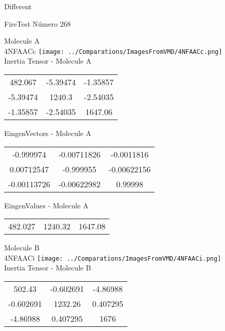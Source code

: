 \begin{center}
\vtab
\vtab
\textcolor{NavyBlue}{\Large Different}
\end{center}

 \newpage

\vtab[-2cm]
\begin{center}
{\large FireTest \tab Número 268}
\end{center}
\begin{multicols}{2}
\begin{center}

Molecule A \\ 
4NFAACc
\texttt{[image: ../Comparations/ImagesFromVMD/4NFAACc.png]}
\\
Inertia Tensor - Molecule A \\
\vtab

\begin{tabular}{|c c c|}
482.067	 & 	-5.39474	 & 	-1.35857	 \\
-5.39474	 & 	1240.3	 & 	-2.54035	 \\
-1.35857	 & 	-2.54035	 & 	1647.06
\end{tabular}

\vtab
 EingenVectors - Molecule A     \\
\vtab
\begin{tabular}{|c c c|}
-0.999974	 & 	-0.00711826	 & 	-0.0011816	 \\
0.00712547	 & 	-0.999955	 & 	-0.00622156	 \\
-0.00113726	 & 	-0.00622982	 & 	0.99998
\end{tabular}

\vtab
 EingenValues - Molecule A     \\
\vtab
\begin{tabular}{|c c c|}
482.027	 & 	1240.32	 & 	1647.08	 \\
\end{tabular}
\columnbreak

Molecule B \\ 
4NFAACi
\texttt{[image: ../Comparations/ImagesFromVMD/4NFAACi.png]}
\\
Inertia Tensor - Molecule B \\
\vtab

\begin{tabular}{|c c c|}
502.43	 & 	-0.602691	 & 	-4.86988	 \\
-0.602691	 & 	1232.26	 & 	0.407295	 \\
-4.86988	 & 	0.407295	 & 	1676
\end{tabular}


\end{center}
\end{multicols}

